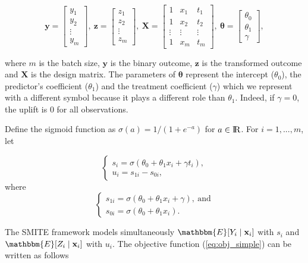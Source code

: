 \documentclass{article}
\def\X{\mathbf X}
\def\x{\mathbf x}
\def \real{\rm I\!R}
\begin{document}
\[
\mathbf{y} = 
\begin{bmatrix}
y_1 \\ y_2 \\ \vdots \\ y_m
\end{bmatrix},~
\mathbf{z} = 
\begin{bmatrix}
z_1 \\ z_2 \\ \vdots \\ z_m
\end{bmatrix},~
\X = 
\begin{bmatrix}
1 & x_1 & t_1 \\ 1 & x_2 & t_2 \\ \vdots & \vdots & \vdots \\ 1 & x_m & t_m
\end{bmatrix},~
\boldsymbol{\theta} = 
\begin{bmatrix}
\theta_0 \\ \theta_1 \\ \gamma
\end{bmatrix},
\]

where $m$ is the batch size, $\mathbf{y}$ is the binary outcome, $\mathbf{z}$ is the transformed outcome and $\X$ is the design matrix. The parameters of $\boldsymbol{\theta}$ represent the intercept ($\theta_0$), the predictor's coefficient ($\theta_1$) and the treatment coefficient ($\gamma$) which we represent with a different symbol because it plays a different role than $\theta_1$. Indeed, if $\gamma = 0$, the uplift is $0$ for all observations.

Define the sigmoid function as $\sigma (a) = 1 / (1 + e^{-a})$ for $a \in \real$. For $i=1,...,m$, let 

\[
\begin{cases} 
      s_i = \sigma( \theta_0 + \theta_1 x_i + \gamma t_i),  \\
      u_i = s_{1i} - s_{0i},
\end{cases}\]
where
\[
\begin{cases}
      s_{1i} = \sigma( \theta_0 + \theta_1 x_i + \gamma), ~ \mathrm{and} \\
      s_{0i} = \sigma( \theta_0 + \theta_1 x_i).
\end{cases}
\]

The SMITE framework models simultaneously $\mathbbm{E}[Y_i \mid \x_i]$ with $s_i$ and $\mathbbm{E}[Z_i \mid \x_i]$ with $u_i$. The objective function (\ref{eq:obj_simple}) can be written as follows
\end{document}
